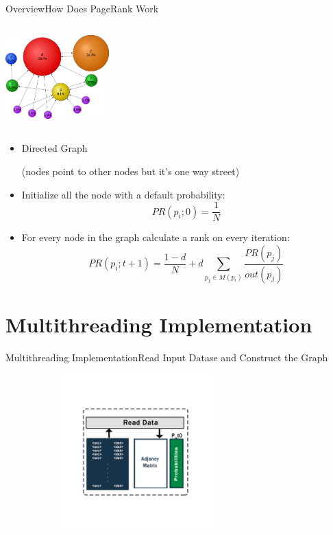\documentclass{beamer}
\begin{document}
\begin{frame}{Overview}{How Does PageRank Work}
    \begin{minipage}{4cm}
        \includegraphics[height=4cm, width=4cm]{figure2.png}
    \end{minipage}%
    \begin{minipage}{7cm}
        \begin{itemize}
            \item{Directed Graph}
                
                (nodes point to other nodes but it's one way
                street)
            \item{Initialize all the node with a default probability: 
                $$PR(p_i;0) = \frac{1}{N}$$
                }
            \item{For every node in the graph calculate a rank on every iteration: 
                $$PR(p_i;{t+1}) = \frac{1-d}{N} + d\sum_{p_j\in
                M(p_i)}\frac{PR(p_j)}{out(p_j)}$$ }
        \end{itemize}
    \end{minipage}
\end{frame}

\section{Multithreading Implementation}
\begin{frame}{Multithreading Implementation}{Read Input Datase and Construct the
    Graph}
    \begin{figure}
        \includegraphics[width=8cm, height=6cm]{implementation1.png}
    \end{figure}
\end{frame}
\end{document}
